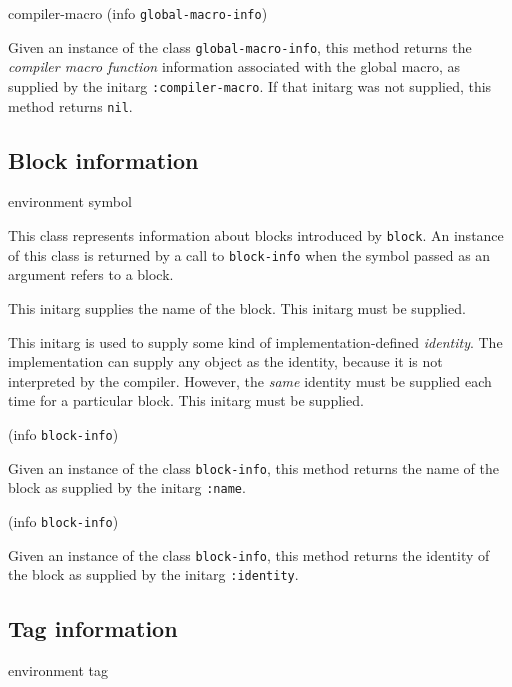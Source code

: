 \Defmethod compiler-macro {(info {\tt global-macro-info})}

Given an instance of the class \texttt{global-macro-info}, this
method returns the \emph{compiler macro function} information
associated with the global macro, as supplied by the initarg
\texttt{:compiler-macro}.  If that initarg was not supplied, this
method returns \texttt{nil}.

\subsection{Block information}

 {environment symbol}


This class represents information about blocks introduced by
\texttt{block}.  An instance of this class is returned by a call to
\texttt{block-info} when the symbol passed as an argument refers to a
block.


This initarg supplies the name of the block.  This initarg must be
supplied.


This initarg is used to supply some kind of implementation-defined 
\emph{identity}.  The implementation can supply any object as the
identity, because it is not interpreted by the compiler.  However, the
\emph{same} identity must be supplied each time for a particular
block.  This initarg must be supplied. 

 {(info {\tt block-info})}

Given an instance of the class \texttt{block-info}, this method
returns the name of the block as supplied by the initarg
\texttt{:name}.

 {(info {\tt block-info})}

Given an instance of the class \texttt{block-info}, this method
returns the identity of the block as supplied by the initarg
\texttt{:identity}.

\subsection{Tag information}

 {environment tag}



